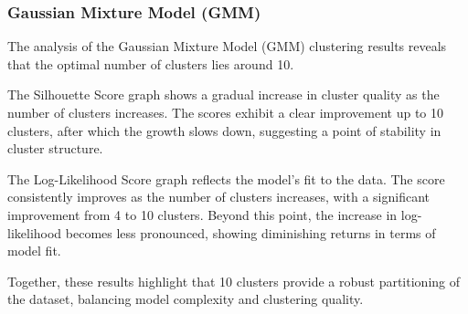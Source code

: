         
        \subsubsection{Gaussian Mixture Model (GMM) \\}

            The analysis of the Gaussian Mixture Model (GMM) clustering results reveals that the optimal number of clusters lies around 10.

            The Silhouette Score graph shows a gradual increase in cluster quality as the number of clusters increases. The scores exhibit a clear improvement up to 10 clusters, after which the growth slows down, suggesting a point of stability in cluster structure.

            The Log-Likelihood Score graph reflects the model's fit to the data. The score consistently improves as the number of clusters increases, with a significant improvement from 4 to 10 clusters. Beyond this point, the increase in log-likelihood becomes less pronounced, showing diminishing returns in terms of model fit.

            Together, these results highlight that 10 clusters provide a robust partitioning of the dataset, balancing model complexity and clustering quality. 
            
